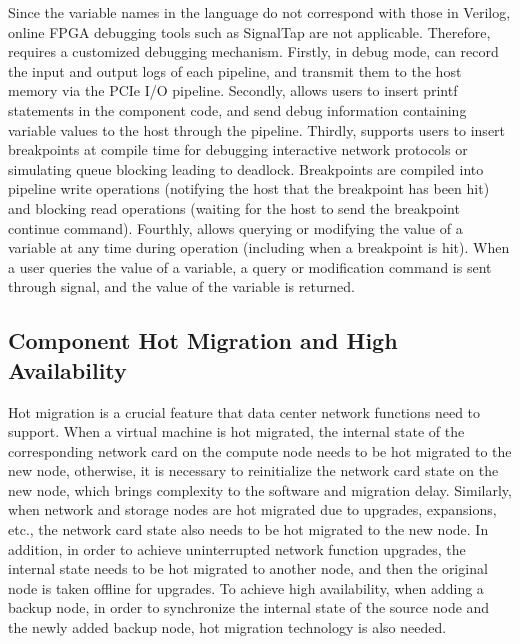 Since the variable names in the \name language do not correspond with those in Verilog, online FPGA debugging tools such as SignalTap are not applicable. Therefore, \name requires a customized debugging mechanism. Firstly, in debug mode, \name can record the input and output logs of each pipeline, and transmit them to the host memory via the PCIe I/O pipeline. Secondly, \name allows users to insert printf statements in the component code, and send debug information containing variable values to the host through the pipeline. Thirdly, \name supports users to insert breakpoints at compile time for debugging interactive network protocols or simulating queue blocking leading to deadlock. Breakpoints are compiled into pipeline write operations (notifying the host that the breakpoint has been hit) and blocking read operations (waiting for the host to send the breakpoint continue command). Fourthly, \name allows querying or modifying the value of a variable at any time during operation (including when a breakpoint is hit). When a user queries the value of a variable, a query or modification command is sent through signal, and the value of the variable is returned.

\subsection{Component Hot Migration and High Availability}
\label{subsec:clicknp:fault-tolerance}

Hot migration is a crucial feature that data center network functions need to support. When a virtual machine is hot migrated, the internal state of the corresponding network card on the compute node needs to be hot migrated to the new node, otherwise, it is necessary to reinitialize the network card state on the new node, which brings complexity to the software and migration delay. Similarly, when network and storage nodes are hot migrated due to upgrades, expansions, etc., the network card state also needs to be hot migrated to the new node. In addition, in order to achieve uninterrupted network function upgrades, the internal state needs to be hot migrated to another node, and then the original node is taken offline for upgrades. To achieve high availability, when adding a backup node, in order to synchronize the internal state of the source node and the newly added backup node, hot migration technology is also needed.

